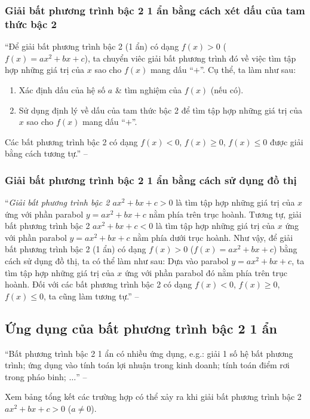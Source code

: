 \documentclass[oneside]{book}
\numberwithin{equation}{section}
\begin{document}
\subsubsection{Giải bất phương trình bậc 2 1 ẩn bằng cách xét dấu của tam thức bậc 2}
``Để giải bất phương trình bậc 2 (1 ẩn) có dạng $f(x) > 0$ ($f(x) = ax^2 + bx + c$), ta chuyển viêc giải bất phương trình đó về việc tìm tập hợp những giá trị của $x$ sao cho $f(x)$ mang dấu ``$+$''. Cụ thể, ta làm như sau:
\begin{enumerate}
	\item Xác định dấu của hệ số $a$ \& tìm nghiệm của $f(x)$ (nếu có).
	\item Sử dụng định lý về dấu của tam thức bậc 2 để tìm tập hợp những giá trị của $x$ sao cho $f(x)$ mang dấu ``$+$''.
\end{enumerate}
Các bất phương trình bậc 2 có dạng $f(x) < 0$, $f(x)\ge 0$, $f(x)\le 0$ được giải bằng cách tương tự.'' -- \cite[p. 50]{SGK_Toan_10_Canh_Dieu_tap_1}

\subsubsection{Giải bất phương trình bậc 2 1 ẩn bằng cách sử dụng đồ thị}
``\textit{Giải bất phương trình bậc 2 $ax^2 + bx + c > 0$} là tìm tập hợp những giá trị của $x$ ứng với phần parabol $y = ax^2 + bx + c$ nằm phía trên trục hoành. Tương tự, giải bất phương trình bậc 2 $ax^2 + bx + c < 0$ là tìm tập hợp những giá trị của $x$ ứng với phần parabol $y = ax^2 + bx + c$ nằm phía dưới trục hoành. Như vậy, để giải bất phương trình bậc 2 (1 ẩn) có dạng $f(x) > 0$ ($f(x) = ax^2 + bx + c$) bằng cách sử dụng đồ thị, ta có thể làm như sau: Dựa vào parabol $y = ax^2 + bx + c$, ta tìm tập hợp những giá trị của $x$ ứng với phần parabol đó nằm phía trên trục hoành. Đối với các bất phương trình bậc 2 có dạng $f(x) < 0$, $f(x)\ge 0$, $f(x)\le 0$, ta cũng làm tương tự.'' -- \cite[p. 51]{SGK_Toan_10_Canh_Dieu_tap_1}

\subsection{Ứng dụng của bất phương trình bậc 2 1 ẩn}
``Bất phương trình bậc 2 1 ẩn có nhiều ứng dụng, e.g.: giải 1 số hệ bất phương trình; ứng dụng vào tính toán lợi nhuận trong kinh doanh; tính toán điểm rơi trong pháo binh; $\ldots$'' -- \cite[p. 52]{SGK_Toan_10_Canh_Dieu_tap_1}

Xem \cite[p. 55]{SGK_Toan_10_Canh_Dieu_tap_1} bảng tổng kết các trường hợp có thể xảy ra khi giải bất phương trình bậc 2 $ax^2 + bx + c > 0$ ($a\ne 0$).
\end{document}
